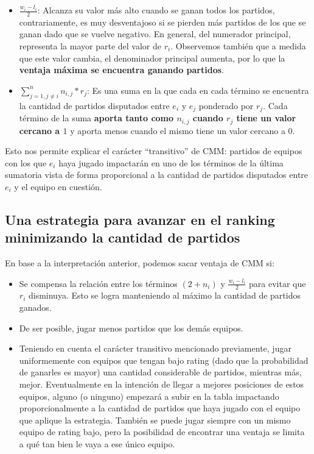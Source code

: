 \begin{itemize}
    \item $\frac{w_i - l_i}{2}$: Alcanza su valor más alto cuando se ganan todos los partidos, contrariamente, es muy desventajoso si se pierden más partidos de los que se ganan dado que se vuelve negativo. En general, del numerador principal, representa la mayor parte del valor de $r_i$. Observemos también que a medida que este valor cambia, el denominador principal aumenta, por lo que la \textbf{ventaja máxima se encuentra ganando partidos}.
    \item $\sum_{j=1, j \neq i}^{n}{n_{i,j} * r_j}$: Es una suma en la que cada en cada término se encuentra la cantidad de partidos disputados entre $e_i$ y $e_j$ ponderado por $r_j$. Cada término de la suma \textbf{aporta tanto como $n_{i, j}$ cuando $r_j$ tiene un valor cercano a $1$} y aporta menos cuando el mismo tiene un valor cercano a $0$.
\end{itemize}

\newpage
Esto nos permite explicar el carácter ``transitivo'' de CMM: partidos de equipos con los que $e_i$ haya jugado impactarán en uno de los términos de la última sumatoria vista de forma proporcional a la cantidad de partidos disputados entre $e_i$ y el equipo en cuestión.

\subsection{Una estrategia para avanzar en el ranking minimizando la cantidad de partidos}\label{estrategia}

En base a la interpretación anterior, podemos sacar ventaja de CMM si:

\begin{itemize}
    \item Se compensa la relación entre los términos $(2 + n_i)$ y $\frac{w_i - l_i}{2}$ para evitar que $r_i$ disminuya. Esto se logra manteniendo al máximo la cantidad de partidos ganados.
    \item De ser posible, jugar menos partidos que los demás equipos.
    \item Teniendo en cuenta el carácter transitivo mencionado previamente, jugar uniformemente con equipos que tengan bajo rating (dado que la probabilidad de ganarles es mayor) una cantidad considerable de partidos, mientras más, mejor. Eventualmente en la intención de llegar a mejores posiciones de estos equipos, alguno (o ninguno) empezará a subir en la tabla impactando proporcionalmente a la cantidad de partidos que haya jugado con el equipo que aplique la estrategia. También se puede jugar siempre con un mismo equipo de rating bajo, pero la posibilidad de encontrar una ventaja se limita a qué tan bien le vaya a ese único equipo.
\end{itemize}

